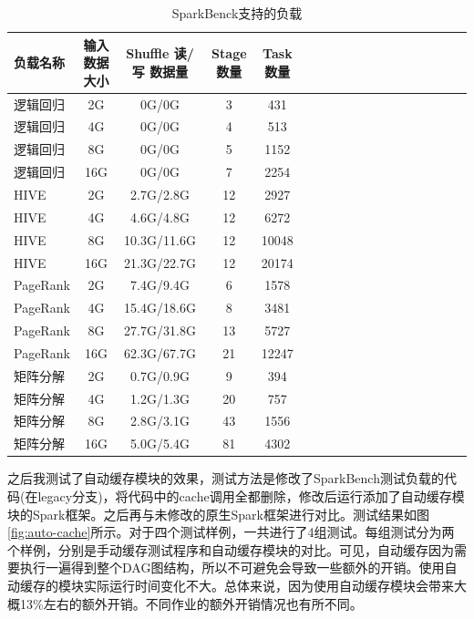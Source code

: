 \begin{table}
 \centering
 \caption{SparkBenck支持的负载}
 \label{tab:workload}
 \begin{tabular}{lccccccccccccccccl}
  \toprule
  负载名称 & 输入数据大小 & Shuffle 读/写 数据量 & Stage 数量 & Task 数量 \\
  \midrule
  逻辑回归 & 2G & 0G/0G & 3 & 431 \\  
  逻辑回归 & 4G & 0G/0G & 4 & 513 \\  
  逻辑回归 & 8G & 0G/0G & 5 & 1152 \\  
  逻辑回归 & 16G & 0G/0G & 7 & 2254 \\  
  HIVE & 2G & 2.7G/2.8G & 12 & 2927 \\  
  HIVE & 4G & 4.6G/4.8G & 12 & 6272 \\  
  HIVE & 8G & 10.3G/11.6G & 12 & 10048 \\  
  HIVE & 16G & 21.3G/22.7G & 12 & 20174 \\ 
  PageRank & 2G & 7.4G/9.4G & 6 & 1578 \\  
  PageRank & 4G & 15.4G/18.6G & 8 & 3481 \\  
  PageRank & 8G & 27.7G/31.8G & 13 & 5727 \\  
  PageRank & 16G & 62.3G/67.7G & 21 & 12247 \\
  矩阵分解 & 2G & 0.7G/0.9G & 9 & 394 \\  
  矩阵分解 & 4G & 1.2G/1.3G & 20 & 757 \\  
  矩阵分解 & 8G & 2.8G/3.1G & 43 & 1556 \\  
  矩阵分解 & 16G & 5.0G/5.4G & 81 & 4302\\  
  \bottomrule
 \end{tabular}
\end{table}

之后我测试了自动缓存模块的效果，测试方法是修改了SparkBench测试负载的代码(在legacy分支)，将代码中的cache调用全都删除，修改后运行添加了自动缓存模块的Spark框架。之后再与未修改的原生Spark框架进行对比。测试结果如图\ref{fig:auto-cache}所示。对于四个测试样例，一共进行了4组测试。每组测试分为两个样例，分别是手动缓存测试程序和自动缓存模块的对比。可见，自动缓存因为需要执行一遍得到整个DAG图结构，所以不可避免会导致一些额外的开销。使用自动缓存的模块实际运行时间变化不大。总体来说，因为使用自动缓存模块会带来大概13\%左右的额外开销。不同作业的额外开销情况也有所不同。

